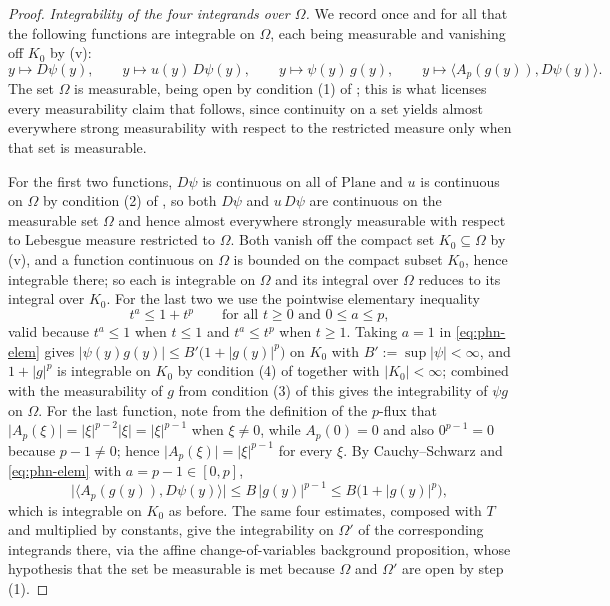 \begin{proof}
\medskip\noindent\emph{Integrability of the four integrands over $\Omega$.}
We record once and for all that the following functions are integrable on $\Omega$, each
being measurable and vanishing off $K_0$ by (v):
\[
  y\mapsto D\psi(y),\qquad
  y\mapsto u(y)\,D\psi(y),\qquad
  y\mapsto \psi(y)\,g(y),\qquad
  y\mapsto \bigl\langle A_p(g(y)),D\psi(y)\bigr\rangle .
\]
The set $\Omega$ is measurable, being open by condition (1) of ; this is what
licenses every measurability claim that follows, since continuity on a set yields almost
everywhere strong measurability with respect to the restricted measure only when that set is
measurable.

For the first two functions, $D\psi$ is continuous on all of $\mathrm{Plane}$ and $u$ is
continuous on $\Omega$ by condition (2) of , so both $D\psi$ and
$u\,D\psi$ are continuous on the measurable set $\Omega$ and hence almost everywhere strongly
measurable with respect to Lebesgue measure restricted to $\Omega$.  Both vanish off the
compact set $K_0\subseteq\Omega$ by (v), and a function continuous on $\Omega$ is bounded on
the compact subset $K_0$, hence integrable there; so each is integrable on $\Omega$ and its
integral over $\Omega$ reduces to its integral over $K_0$.  For the last two we use the
pointwise elementary inequality
\begin{equation}\label{eq:phn-elem}
  t^{a}\le 1+t^{p}\qquad\text{for all }t\ge0\text{ and }0\le a\le p,
\end{equation}
valid because $t^{a}\le1$ when $t\le1$ and $t^{a}\le t^{p}$ when $t\ge1$.  Taking $a=1$ in
\eqref{eq:phn-elem} gives $\lvert\psi(y)g(y)\rvert\le B'\bigl(1+\lvert g(y)\rvert^{p}\bigr)$
on $K_0$ with $B':=\sup\lvert\psi\rvert<\infty$, and $1+\lvert g\rvert^{p}$ is integrable on
$K_0$ by condition (4) of  together with $\lvert K_0\rvert<\infty$; combined
with the measurability of $g$ from condition (3) of  this gives the
integrability of $\psi g$ on $\Omega$.  For the last function, note from the definition of the
$p$-flux  that $\lvert A_p(\xi)\rvert=\lvert\xi\rvert^{p-2}\lvert\xi\rvert
=\lvert\xi\rvert^{p-1}$ when $\xi\neq0$, while $A_p(0)=0$ and also $0^{p-1}=0$ because
$p-1\neq0$; hence $\lvert A_p(\xi)\rvert=\lvert\xi\rvert^{p-1}$ for every $\xi$.  By
Cauchy--Schwarz and \eqref{eq:phn-elem} with $a=p-1\in[0,p]$,
\[
  \bigl\lvert\bigl\langle A_p(g(y)),D\psi(y)\bigr\rangle\bigr\rvert
  \le B\,\lvert g(y)\rvert^{p-1}\le B\bigl(1+\lvert g(y)\rvert^{p}\bigr),
\]
which is integrable on $K_0$ as before.  The same four estimates, composed with $T$ and
multiplied by constants, give the integrability on $\Omega'$ of the corresponding integrands
there, via the affine change-of-variables background proposition, whose hypothesis that the
set be measurable is met because $\Omega$ and $\Omega'$ are open by step (1).


\end{proof}
